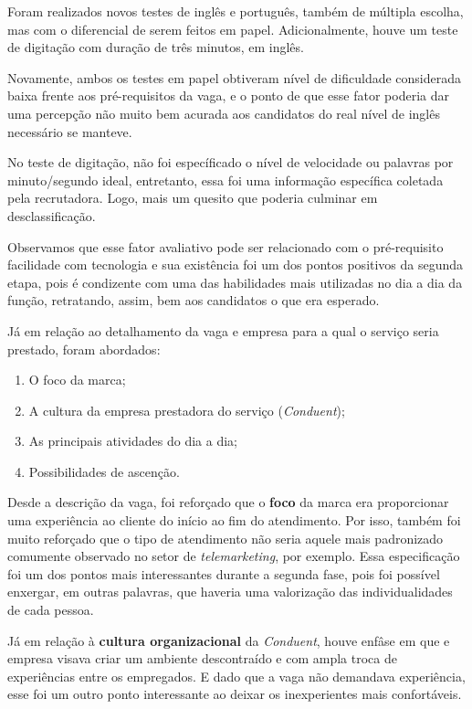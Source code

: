 \documentclass[12pt]{article}
\begin{document}
Foram realizados novos testes de inglês e português, também de múltipla escolha, mas com o diferencial de serem feitos em papel. Adicionalmente, houve um teste de digitação com duração de três minutos, em inglês. 

Novamente, ambos os testes em papel obtiveram nível de dificuldade considerada baixa frente aos pré-requisitos da vaga, e o ponto de que esse fator poderia dar uma percepção não muito bem acurada aos candidatos do real nível de inglês necessário se manteve. 

No teste de digitação, não foi específicado o nível de velocidade ou palavras por minuto/segundo ideal, entretanto, essa foi uma informação específica coletada pela recrutadora. Logo, mais um quesito que poderia culminar em desclassificação. 

Observamos que esse fator avaliativo pode ser relacionado com o pré-requisito facilidade com tecnologia e sua existência foi um dos pontos positivos da segunda etapa, pois é condizente com uma das habilidades mais utilizadas no dia a dia da função, retratando, assim, bem aos candidatos o que era esperado. 

Já em relação ao detalhamento da vaga e empresa para a qual o serviço seria prestado, foram abordados: 

\begin{enumerate}
   	\item O foco da marca;
	\item A cultura da empresa prestadora do serviço (\emph{Conduent});
   	\item As principais atividades do dia a dia; 
   	\item Possibilidades de ascenção. 
\end{enumerate}

Desde a descrição da vaga, foi reforçado que o \textbf{foco} da marca era proporcionar uma experiência ao cliente do início ao fim do atendimento. Por isso, também foi muito reforçado que o tipo de atendimento não seria aquele mais padronizado comumente observado no setor de \emph {telemarketing}, por exemplo. Essa especificação foi um dos pontos mais interessantes durante a segunda fase, pois foi possível enxergar, em outras palavras, que haveria uma valorização das individualidades de cada pessoa. 

Já em relação à \textbf{cultura organizacional} da \emph{Conduent}, houve enfâse em que e empresa visava criar um ambiente descontraído e com ampla troca de experiências entre os empregados. E dado que a vaga não demandava experiência, esse foi um outro ponto interessante ao deixar os inexperientes mais confortáveis.
\end{document}

